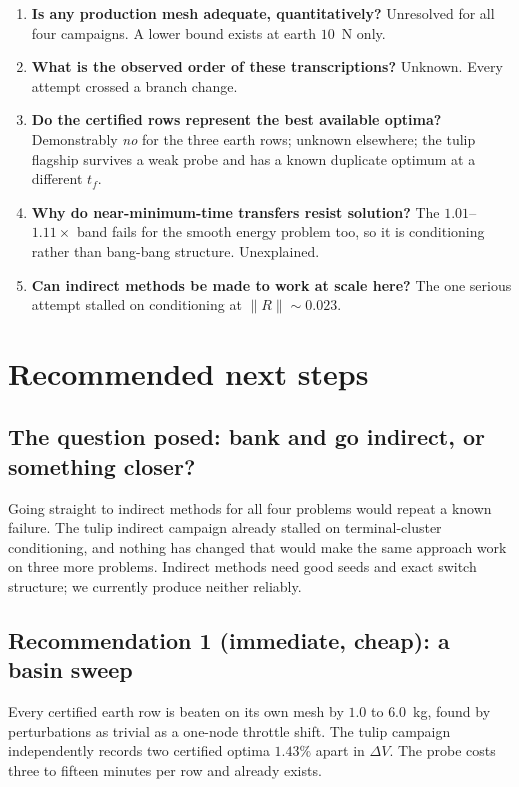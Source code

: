 \documentclass[11pt]{article}
\newcommand{\dV}{\Delta V}
\begin{document}
\begin{enumerate}
  \item \textbf{Is any production mesh adequate, quantitatively?} Unresolved
  for all four campaigns. A lower bound exists at earth $10$~N only.
  \item \textbf{What is the observed order of these transcriptions?} Unknown.
  Every attempt crossed a branch change.
  \item \textbf{Do the certified rows represent the best available optima?}
  Demonstrably \emph{no} for the three earth rows; unknown elsewhere; the tulip
  flagship survives a weak probe and has a known duplicate optimum at a
  different $t_f$.
  \item \textbf{Why do near-minimum-time transfers resist solution?} The
  $1.01$--$1.11\times$ band fails for the smooth energy problem too, so it is
  conditioning rather than bang-bang structure. Unexplained.
  \item \textbf{Can indirect methods be made to work at scale here?} The one
  serious attempt stalled on conditioning at $\|R\|\sim0.023$.
\end{enumerate}

\section{Recommended next steps}
\label{sec:rec}

\subsection{The question posed: bank and go indirect, or something closer?}

Going straight to indirect methods for all four problems would repeat a known
failure. The tulip indirect campaign already stalled on terminal-cluster
conditioning, and nothing has changed that would make the same approach work on
three more problems. Indirect methods need good seeds and exact switch
structure; we currently produce neither reliably.

\subsection{Recommendation 1 (immediate, cheap): a basin sweep}

Every certified earth row is beaten on its own mesh by $1.0$ to $6.0$~kg, found
by perturbations as trivial as a one-node throttle shift. The tulip campaign
independently records two certified optima $1.43\%$ apart in $\dV$. The probe
costs three to fifteen minutes per row and already exists.
\end{document}

